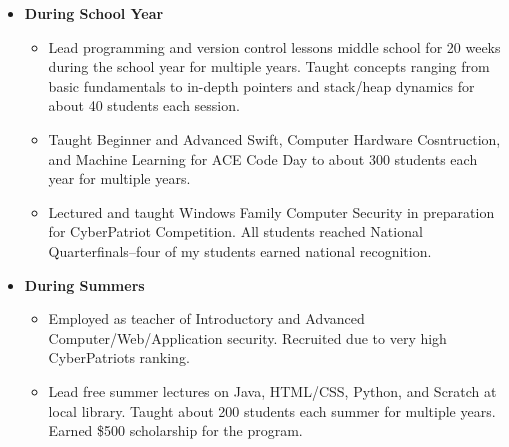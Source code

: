 \documentclass[10pt]{article}
\newenvironment{outerlist}[1][\enskip\textbullet]%
        {\begin{itemize}[#1,leftmargin=*]}{\end{itemize}%
         \vspace{-.6\baselineskip}}
\newenvironment{innerlist}[1][\enskip\textbullet]%
        {\begin{itemize}[#1,leftmargin=*,parsep=0pt,itemsep=0pt,topsep=0pt,partopsep=0pt]}
        {\end{itemize}}
\begin{document}
\begin{outerlist}
\item[] \textbf{During School Year}
\begin{innerlist}
\item[] Lead programming  and version control lessons middle school for 20 weeks during the school year for multiple years. Taught concepts ranging from basic fundamentals to in-depth pointers and stack/heap dynamics for about 40 students each session. 
\vspace{.1in}
\item[] Taught Beginner and Advanced Swift, Computer Hardware Cosntruction, and Machine Learning for ACE Code Day to about 300 students each year for multiple years.
\vspace{.1in}
\item[] Lectured and taught Windows Family Computer Security in preparation for CyberPatriot Competition. All students reached National Quarterfinals--four of my students earned national recognition.
\end{innerlist}
\item[] \textbf{During Summers}
\begin{innerlist}
\item[] Employed as teacher of Introductory and Advanced Computer/Web/Application security. Recruited due to very high CyberPatriots ranking. 
\vspace{.1in}
\item[] Lead free summer lectures on Java, HTML/CSS, Python, and Scratch at local library. Taught about 200 students each summer for multiple years. Earned \$500 scholarship for the program.
\end{innerlist}
\end{outerlist}
\end{document}
